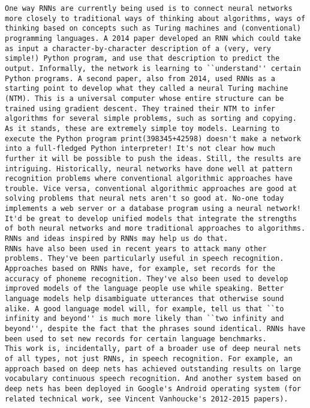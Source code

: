 \begin{lstlisting}
One way RNNs are currently being used is to connect neural networks more closely to traditional ways of thinking about algorithms, ways of thinking based on concepts such as Turing machines and (conventional) programming languages. A 2014 paper developed an RNN which could take as input a character-by-character description of a (very, very simple!) Python program, and use that description to predict the output. Informally, the network is learning to ``understand'' certain Python programs. A second paper, also from 2014, used RNNs as a starting point to develop what they called a neural Turing machine (NTM). This is a universal computer whose entire structure can be trained using gradient descent. They trained their NTM to infer algorithms for several simple problems, such as sorting and copying.
As it stands, these are extremely simple toy models. Learning to execute the Python program print(398345+42598) doesn't make a network into a full-fledged Python interpreter! It's not clear how much further it will be possible to push the ideas. Still, the results are intriguing. Historically, neural networks have done well at pattern recognition problems where conventional algorithmic approaches have trouble. Vice versa, conventional algorithmic approaches are good at solving problems that neural nets aren't so good at. No-one today implements a web server or a database program using a neural network! It'd be great to develop unified models that integrate the strengths of both neural networks and more traditional approaches to algorithms. RNNs and ideas inspired by RNNs may help us do that.
RNNs have also been used in recent years to attack many other problems. They've been particularly useful in speech recognition. Approaches based on RNNs have, for example, set records for the accuracy of phoneme recognition. They've also been used to develop improved models of the language people use while speaking. Better language models help disambiguate utterances that otherwise sound alike. A good language model will, for example, tell us that ``to infinity and beyond'' is much more likely than ``two infinity and beyond'', despite the fact that the phrases sound identical. RNNs have been used to set new records for certain language benchmarks.
This work is, incidentally, part of a broader use of deep neural nets of all types, not just RNNs, in speech recognition. For example, an approach based on deep nets has achieved outstanding results on large vocabulary continuous speech recognition. And another system based on deep nets has been deployed in Google's Android operating system (for related technical work, see Vincent Vanhoucke's 2012-2015 papers).

\end{lstlisting}
